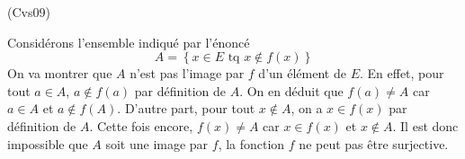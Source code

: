 \begin{tiny}(Cvs09)\end{tiny} Considérons l'ensemble indiqué par l'énoncé 
\begin{displaymath}
  A = \left\lbrace x \in E \text{ tq } x\notin f(x)\right\rbrace 
\end{displaymath}
On va montrer que $A$ n'est pas l'image par $f$ d'un élément de $E$.\newline
En effet, pour tout $a\in A$, $a\notin f(a)$ par définition de $A$. On en déduit que $f(a)\neq A$ car $a\in A$ et $a \notin f(A)$.\newline
D'autre part, pour tout $x\notin A$, on a $x\in f(x)$ par définition de $A$. Cette fois encore, $f(x)\neq A$ car $x\in f(x)$ et $x\notin A$. \newline
Il est donc impossible que $A$ soit une image par $f$, la fonction $f$ ne peut pas être surjective.

